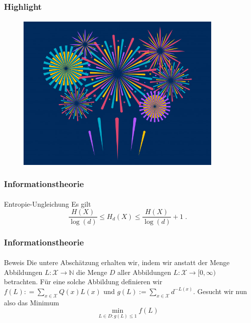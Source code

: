 \documentclass{beamer}
\begin{document}
\begin{frame}
    \frametitle{Highlight}
\framesubtitle{}
\begin{figure}[htp]
      \centering
    \includegraphics[width=0.9\textwidth]{img/firework}
\end{figure}
 \end{frame}

\begin{frame}
    \frametitle{Informationstheorie}
\framesubtitle{}

\begin{block}{Entropie-Ungleichung}
Es gilt
$$ \frac{H(X)}{\log(d)} \leq H_d(X) \leq \frac{H(X)}{\log(d)} +1 \; .$$
\end{block}

 \end{frame}

\begin{frame}
    \frametitle{Informationstheorie}
\framesubtitle{}

\begin{block}{Beweis}
Die untere Abschätzung erhalten wir, indem wir  anstatt der Menge Abbildungen $L: \mathcal{X} \to \mathbb{N}$ die Menge $D$ aller 
Abbildungen $L: \mathcal{X} \to [0, \infty)$ betrachten. Für eine solche Abbildung definieren wir $f(L): = \sum_{x \in \mathcal{X}} Q(x) L(x)$ und 
$g(L):= \sum_{x \in \mathcal{X}} d^{-L(x)}$. Gesucht wir nun also das Minimum
$$ \min_{L \in D : g(L) \leq 1} f(L)$$

\end{block}

 \end{frame}
\end{document}
